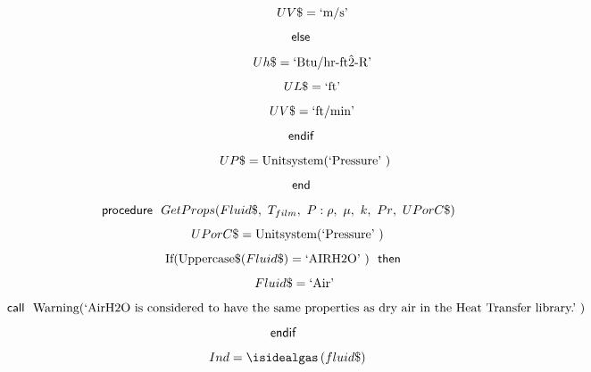 \documentclass[10pt,fleqn]{article}
\newcommand{\F}[1]{\mbox{$#1$}}
\newcommand{\K}[1]{\mbox{\sf#1\ \ \mit}}
\newcommand{\KS}[1]{\mbox{\sf\ \ #1\ \ \mit}}
\newcommand{\SC}[1]{\mbox{`#1'}\  }
\newcommand{\V}[1]{\mbox{$ #1 $}}
\newcommand{\I}{\mbox{\hspace{0.20in}}}
\begin{document}
\begin{equation}
\I \I \I \I \label{EES Eqn:11}
UV\$=\SC{m/s} 
\end{equation}
\begin{equation}
\I \I \I \label{EES Eqn:12}
\K{else} 
\end{equation}
\begin{equation}
\I \I \I \I \label{EES Eqn:13}
Uh\$=\SC{Btu/hr-ft\^2-R} 
\end{equation}
\begin{equation}
\I \I \I \I \label{EES Eqn:14}
UL\$=\SC{ft} 
\end{equation}
\begin{equation}
\I \I \I \I \label{EES Eqn:15}
UV\$=\SC{ft/min} 
\end{equation}
\begin{equation}
\I \I \I \label{EES Eqn:16}
\K{endif} 
\end{equation}
\begin{equation}
\I \I \I \label{EES Eqn:17}
UP\$=\mbox{Unitsystem}{ \left( \SC{Pressure} \right) } 
\end{equation}
\begin{equation}
\I \I \I \label{EES Eqn:18}
\K{end} 
\end{equation}
\vspace{0.1 in}
\begin{equation}
\label{EES Eqn:19}
\K{procedure} \F{GetProps}{ \left( Fluid\$,\ T_{film},\ P:\rho,\ \mu,\ k,\ \V{Pr} ,\ UPorC\$ \right) } 
\end{equation}
\begin{equation}
\I \label{EES Eqn:20}
UPorC\$=\mbox{Unitsystem}{ \left( \SC{Pressure} \right) } 
\end{equation}
\begin{equation}
\I \label{EES Eqn:21}
\mbox{If}{ \left( \mbox{Uppercase\$}{ \left( Fluid\$ \right) }=\SC{AIRH2O} \right) } \KS{then} 
\end{equation}
\begin{equation}
\I \I \label{EES Eqn:22}
Fluid\$=\SC{Air} 
\end{equation}
\begin{equation}
\I \I \label{EES Eqn:23}
\K{call} \mbox{Warning}{ \left( \SC{AirH2O is considered to have the same properties as dry air in the Heat Transfer library.} \right) } 
\end{equation}
\begin{equation}
\I \label{EES Eqn:24}
\K{endif} 
\end{equation}
\begin{equation}
\I \label{EES Eqn:25}
\V{Ind} =\isidealgas \left(\F{fluid}\$ \right)  
\end{equation}
\end{document}
